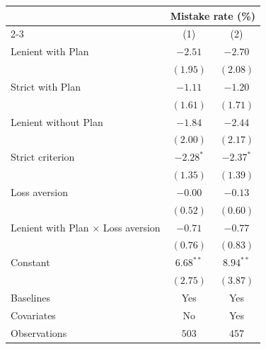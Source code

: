 \begin{tabular}{l c c}
\toprule
 & \multicolumn{2}{c}{Mistake rate (\%)} \\
\cmidrule(lr){2-3}
 & (1) & (2) \\
\midrule
Lenient with Plan                        & $-2.51$     & $-2.70$     \\
                                         & $(1.95)$    & $(2.08)$    \\
Strict with Plan                         & $-1.11$     & $-1.20$     \\
                                         & $(1.61)$    & $(1.71)$    \\
Lenient without Plan                     & $-1.84$     & $-2.44$     \\
                                         & $(2.00)$    & $(2.17)$    \\
Strict criterion                         & $-2.28^{*}$ & $-2.37^{*}$ \\
                                         & $(1.35)$    & $(1.39)$    \\
Loss aversion                            & $-0.00$     & $-0.13$     \\
                                         & $(0.52)$    & $(0.60)$    \\
Lenient with Plan $\times$ Loss aversion & $-0.71$     & $-0.77$     \\
                                         & $(0.76)$    & $(0.83)$    \\
Constant                                 & $6.68^{**}$ & $8.94^{**}$ \\
                                         & $(2.75)$    & $(3.87)$    \\
\midrule
Baselines                                & Yes         & Yes         \\
Covariates                               & No          & Yes         \\
Observations                                & $503$       & $457$       \\
\bottomrule
\end{tabular}

